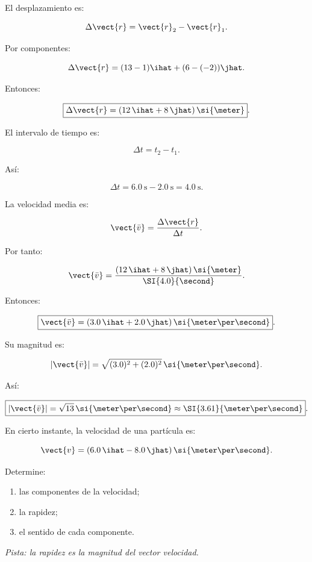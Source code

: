 \begin{explicacion}
El desplazamiento es:

\[
\Delta\vect{r}
=
\vect{r}_2-\vect{r}_1.
\]

Por componentes:

\[
\Delta\vect{r}
=
(13-1)\ihat
+
(6-(-2))\jhat.
\]

Entonces:

\[
\boxed{
\Delta\vect{r}
=
(12\,\ihat+8\,\jhat)\,\si{\meter}
}.
\]

El intervalo de tiempo es:

\[
\Delta t=t_2-t_1.
\]

Así:

\[
\Delta t
=
\SI{6.0}{\second}
-
\SI{2.0}{\second}
=
\SI{4.0}{\second}.
\]

La velocidad media es:

\[
\vect{\bar{v}}
=
\frac{\Delta\vect{r}}{\Delta t}.
\]

Por tanto:

\[
\vect{\bar{v}}
=
\frac{
(12\,\ihat+8\,\jhat)\,\si{\meter}
}
{\SI{4.0}{\second}}.
\]

Entonces:

\[
\boxed{
\vect{\bar{v}}
=
(3.0\,\ihat+2.0\,\jhat)\,\si{\meter\per\second}
}.
\]

Su magnitud es:

\[
|\vect{\bar{v}}|
=
\sqrt{(3.0)^2+(2.0)^2}\,
\si{\meter\per\second}.
\]

Así:

\[
\boxed{
|\vect{\bar{v}}|
=
\sqrt{13}\,\si{\meter\per\second}
\approx
\SI{3.61}{\meter\per\second}
}.
\]
\end{explicacion}


\begin{ejercicio}
En cierto instante, la velocidad de una partícula es:

\[
\vect{v}
=
(6.0\,\ihat-8.0\,\jhat)\,\si{\meter\per\second}.
\]

Determine:

\begin{enumerate}[label=\alph*)]
    \item las componentes de la velocidad;
    \item la rapidez;
    \item el sentido de cada componente.
\end{enumerate}

\textit{Pista: la rapidez es la magnitud del vector velocidad.}
\end{ejercicio}

